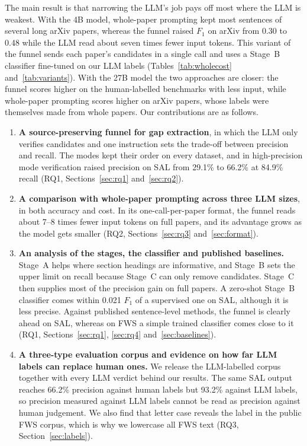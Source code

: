 The main result is that narrowing the LLM's job pays off most where the LLM is weakest. With the 4B model, whole-paper prompting kept most sentences of several long arXiv papers, whereas the funnel raised $F_1$ on arXiv from 0.30 to 0.48 while the LLM read about seven times fewer input tokens. This variant of the funnel sends each paper's candidates in a single call and uses a Stage~B classifier fine-tuned on our LLM labels (Tables~\ref{tab:wholecost} and~\ref{tab:variants}). With the 27B model the two approaches are closer: the funnel scores higher on the human-labelled benchmarks with less input, while whole-paper prompting scores higher on arXiv papers, whose labels were themselves made from whole papers. Our contributions are as follows.
\begin{enumerate}
  \item \textbf{A source-preserving funnel for gap extraction}, in which the LLM only verifies candidates and one instruction sets the trade-off between precision and recall. The modes kept their order on every dataset, and in high-precision mode verification raised precision on SAL from 29.1\% to 66.2\% at 84.9\% recall (RQ1, Sections~\ref{sec:rq1} and~\ref{sec:rq2}).
  \item \textbf{A comparison with whole-paper prompting across three LLM sizes}, in both accuracy and cost. In its one-call-per-paper format, the funnel reads about 7--8 times fewer input tokens on full papers, and its advantage grows as the model gets smaller (RQ2, Sections~\ref{sec:rq3} and~\ref{sec:format}).
  \item \textbf{An analysis of the stages, the classifier and published baselines.} Stage~A helps where section headings are informative, and Stage~B sets the upper limit on recall because Stage~C can only remove candidates. Stage~C then supplies most of the precision gain on full papers. A zero-shot Stage~B classifier comes within 0.021 $F_1$ of a supervised one on SAL, although it is less precise. Against published sentence-level methods, the funnel is clearly ahead on SAL, whereas on FWS a simple trained classifier comes close to it (RQ1, Sections~\ref{sec:rq1}, \ref{sec:rq4} and~\ref{sec:baselines}).
  \item \textbf{A three-type evaluation corpus and evidence on how far LLM labels can replace human ones.} We release the LLM-labelled corpus together with every LLM verdict behind our results. The same SAL output reaches 66.2\% precision against human labels but 93.2\% against LLM labels, so precision measured against LLM labels cannot be read as precision against human judgement. We also find that letter case reveals the label in the public FWS corpus, which is why we lowercase all FWS text (RQ3, Section~\ref{sec:labels}).
\end{enumerate}


